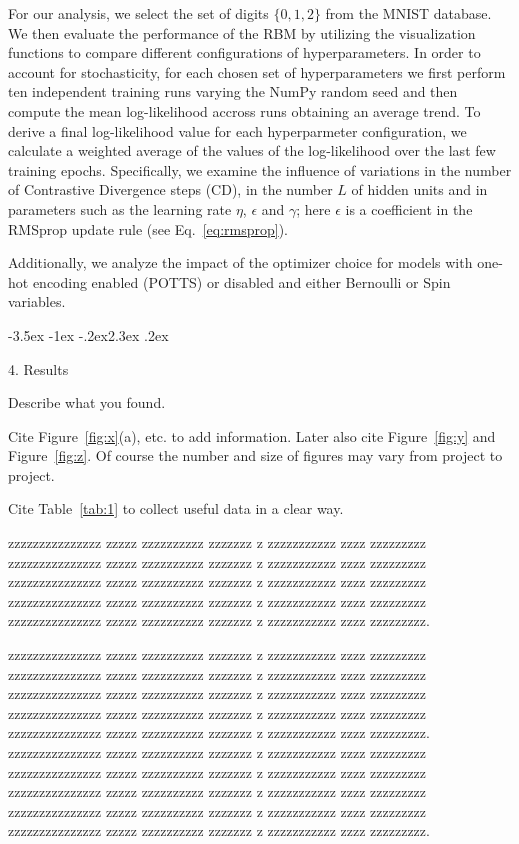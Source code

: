 \documentclass[prl,twocolumn]{revtex4-1}
\makeatletter
\renewcommand{\section}{\@startsection{section}{1}{\z@}%
	{-3.5ex \@plus -1ex \@minus -.2ex}{2.3ex \@plus.2ex}%
	{\normalfont\bfseries\raggedright}}
\makeatother
\begin{document}
For our analysis, we select the set of digits $\{0,1,2\}$ from the MNIST database. We then evaluate the performance of the RBM by utilizing the visualization functions to compare different configurations of hyperparameters. In order to account for stochasticity, for each chosen set of hyperparameters we first perform ten independent training runs varying the NumPy random seed and then compute the mean log-likelihood accross runs obtaining an average trend. To derive a final log-likelihood value for each hyperparmeter configuration, we calculate a weighted average of the values of the log-likelihood over the last few training epochs. Specifically, we examine the influence of variations in the number of Contrastive Divergence steps (CD), in the number $L$ of hidden units and in parameters such as the learning rate $\eta$, $\epsilon$ and $\gamma$; here $\epsilon$ is a coefficient in the RMSprop update rule (see Eq.~\ref{eq:rmsprop}).

Additionally, we analyze the impact of the optimizer choice for models with one-hot encoding enabled (POTTS) or disabled and either Bernoulli or Spin variables.


\section{4. Results}


Describe what you found.

Cite Figure~\ref{fig:x}(a), etc. to add information. Later also cite Figure~\ref{fig:y} and  Figure~\ref{fig:z}. Of course the number and size of figures may vary from project to project.

Cite Table~\ref{tab:1} to collect useful data in a clear way.

  zzzzzzzzzzzzzzz zzzzz zzzzzzzzzz zzzzzzz z zzzzzzzzzzz zzzz zzzzzzzzz
  zzzzzzzzzzzzzzz zzzzz zzzzzzzzzz zzzzzzz z zzzzzzzzzzz zzzz zzzzzzzzz
  zzzzzzzzzzzzzzz zzzzz zzzzzzzzzz zzzzzzz z zzzzzzzzzzz zzzz zzzzzzzzz
  zzzzzzzzzzzzzzz zzzzz zzzzzzzzzz zzzzzzz z zzzzzzzzzzz zzzz zzzzzzzzz
  zzzzzzzzzzzzzzz zzzzz zzzzzzzzzz zzzzzzz z zzzzzzzzzzz zzzz zzzzzzzzz.

  zzzzzzzzzzzzzzz zzzzz zzzzzzzzzz zzzzzzz z zzzzzzzzzzz zzzz zzzzzzzzz
  zzzzzzzzzzzzzzz zzzzz zzzzzzzzzz zzzzzzz z zzzzzzzzzzz zzzz zzzzzzzzz
  zzzzzzzzzzzzzzz zzzzz zzzzzzzzzz zzzzzzz z zzzzzzzzzzz zzzz zzzzzzzzz
  zzzzzzzzzzzzzzz zzzzz zzzzzzzzzz zzzzzzz z zzzzzzzzzzz zzzz zzzzzzzzz
  zzzzzzzzzzzzzzz zzzzz zzzzzzzzzz zzzzzzz z zzzzzzzzzzz zzzz zzzzzzzzz.
  zzzzzzzzzzzzzzz zzzzz zzzzzzzzzz zzzzzzz z zzzzzzzzzzz zzzz zzzzzzzzz
  zzzzzzzzzzzzzzz zzzzz zzzzzzzzzz zzzzzzz z zzzzzzzzzzz zzzz zzzzzzzzz
  zzzzzzzzzzzzzzz zzzzz zzzzzzzzzz zzzzzzz z zzzzzzzzzzz zzzz zzzzzzzzz
  zzzzzzzzzzzzzzz zzzzz zzzzzzzzzz zzzzzzz z zzzzzzzzzzz zzzz zzzzzzzzz
  zzzzzzzzzzzzzzz zzzzz zzzzzzzzzz zzzzzzz z zzzzzzzzzzz zzzz zzzzzzzzz.
  
\end{document}
